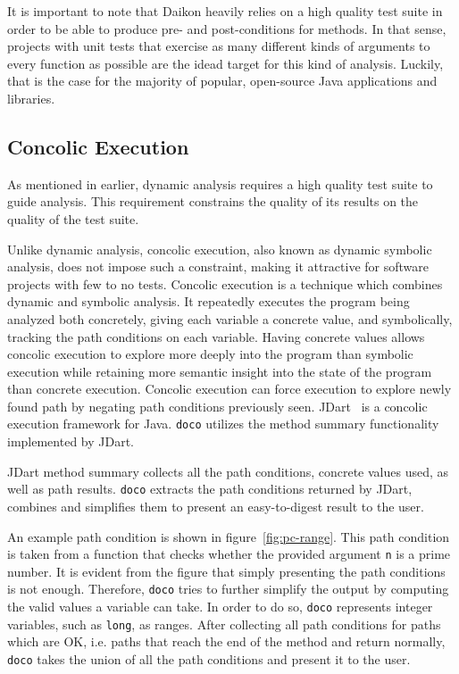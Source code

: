 It is important to note that Daikon heavily relies on a high quality test suite in order to be able to produce pre- and post-conditions for methods. In that sense, projects with unit tests that exercise as many different kinds of arguments to every function as possible are the idead target for this kind of analysis. Luckily, that is the case for the majority of popular, open-source Java applications and libraries.

\subsection{Concolic Execution}

As mentioned in earlier, dynamic analysis requires a high quality test suite to guide analysis. This requirement constrains the quality of its results on the quality of the test suite.

Unlike dynamic analysis, concolic execution, also known as dynamic symbolic analysis, does not impose such a constraint, making it attractive for software projects with few to no tests. Concolic execution is a technique which combines dynamic and symbolic analysis. It repeatedly executes the program being analyzed both concretely, giving each variable a concrete value, and symbolically, tracking the path conditions on each variable. Having concrete values allows concolic execution to explore more deeply into the program than symbolic execution while retaining more semantic insight into the state of the program than concrete execution. Concolic execution can force execution to explore newly found path by negating path conditions previously seen. JDart~\cite{tacas2016-ldghikrr} is a concolic execution framework for Java. \texttt{doco} utilizes the method summary functionality implemented by JDart.

JDart method summary collects all the path conditions, concrete values used, as well as path results. \texttt{doco} extracts the path conditions returned by JDart, combines and simplifies them to present an easy-to-digest result to the user.

An example path condition is shown in figure~\ref{fig:pc-range}. This path condition is taken from a function that checks whether the provided argument \texttt{n} is a prime number. It is evident from the figure that simply presenting the path conditions is not enough. Therefore, \texttt{doco} tries to further simplify the output by computing the valid values a variable can take. In order to do so, \texttt{doco} represents integer variables, such as \texttt{long}, as ranges. After collecting all path conditions for paths which are OK, i.e. paths that reach the end of the method and return normally, \texttt{doco} takes the union of all the path conditions and present it to the user. 


